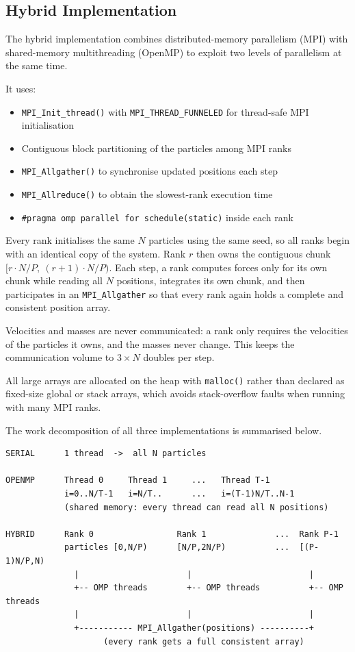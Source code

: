 \documentclass[11pt,a4paper]{article}
\begin{document}
\subsection{Hybrid Implementation}

The hybrid implementation combines distributed-memory parallelism (MPI) with
shared-memory multithreading (OpenMP) to exploit two levels of parallelism at
the same time.

It uses:
\begin{itemize}
  \item \texttt{MPI\_Init\_thread()} with \texttt{MPI\_THREAD\_FUNNELED} for
        thread-safe MPI initialisation
  \item Contiguous block partitioning of the particles among MPI ranks
  \item \texttt{MPI\_Allgather()} to synchronise updated positions each step
  \item \texttt{MPI\_Allreduce()} to obtain the slowest-rank execution time
  \item \texttt{\#pragma omp parallel for schedule(static)} inside each rank
\end{itemize}

Every rank initialises the same $N$ particles using the same seed, so all
ranks begin with an identical copy of the system. Rank $r$ then owns the
contiguous chunk $[r \cdot N/P,\ (r+1) \cdot N/P)$. Each step, a rank computes
forces only for its own chunk while reading all $N$ positions, integrates its
own chunk, and then participates in an \texttt{MPI\_Allgather} so that every
rank again holds a complete and consistent position array.

Velocities and masses are never communicated: a rank only requires the
velocities of the particles it owns, and the masses never change. This keeps
the communication volume to $3 \times N$ doubles per step.

All large arrays are allocated on the heap with \texttt{malloc()} rather than
declared as fixed-size global or stack arrays, which avoids stack-overflow
faults when running with many MPI ranks.

The work decomposition of all three implementations is summarised below.

\begin{lstlisting}[style=code,caption={Work decomposition of the three implementations}]
SERIAL      1 thread  ->  all N particles

OPENMP      Thread 0     Thread 1     ...   Thread T-1
            i=0..N/T-1   i=N/T..      ...   i=(T-1)N/T..N-1
            (shared memory: every thread can read all N positions)

HYBRID      Rank 0                 Rank 1              ...  Rank P-1
            particles [0,N/P)      [N/P,2N/P)          ...  [(P-1)N/P,N)
              |                      |                        |
              +-- OMP threads        +-- OMP threads          +-- OMP threads
              |                      |                        |
              +----------- MPI_Allgather(positions) ----------+
                    (every rank gets a full consistent array)
\end{lstlisting}
\end{document}
